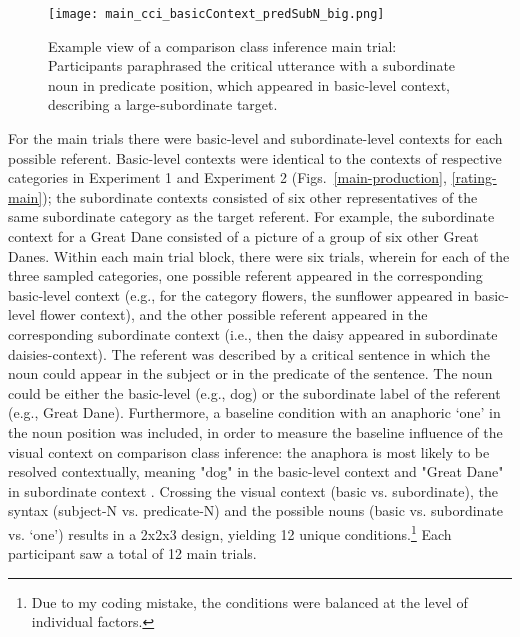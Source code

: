 \begin{figure*}[t]
	\begin{center}
		\texttt{[image: main\_cci\_basicContext\_predSubN\_big.png]}
	\end{center}
	\caption{Example view of a comparison class inference main trial: Participants paraphrased the critical utterance with a subordinate noun in predicate position, which appeared in basic-level context, describing a large-subordinate target.}
	\label{main-cci}
\end{figure*}
For the main trials there were basic-level and subordinate-level contexts for each possible referent. Basic-level contexts were identical to the contexts of respective categories in Experiment 1 and Experiment 2 (Figs.~\ref{main-production}, \ref{rating-main}); the subordinate contexts consisted of six other representatives of the same subordinate category as the target referent. For example, the subordinate context for a Great Dane consisted of a picture of a group of six other Great Danes.  Within each main trial block, there were six trials, wherein for each of the three sampled categories, one possible referent appeared in the corresponding basic-level context (e.g., for the category flowers, the sunflower appeared in basic-level flower context), and the other possible referent appeared in the corresponding subordinate context (i.e., then the daisy appeared in subordinate daisies-context). 
The referent was described by a critical sentence in which the noun could appear in the subject or in the predicate of the sentence. The noun could be either the basic-level (e.g., dog) or the subordinate label of the referent (e.g., Great Dane). Furthermore, a baseline condition with an anaphoric ‘one’ in the noun position was included, in order to measure the baseline influence of the visual context on comparison class inference: the anaphora is most likely to be resolved contextually, meaning "dog" in the basic-level context and "Great Dane" in subordinate context \parencite{goldberg2017one}. Crossing the visual context (basic vs. subordinate), the syntax (subject-N vs. predicate-N) and the possible nouns (basic vs. subordinate vs. ‘one’) results in a 2x2x3 design, yielding 12 unique conditions.\footnote{Due to my coding mistake, the conditions were balanced at the level of individual factors.}
Each participant saw a total of 12 main trials.   

